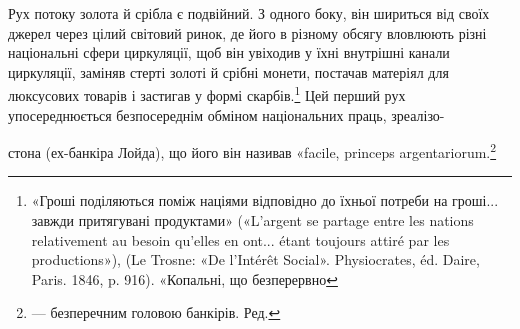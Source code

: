 Рух потоку золота й срібла є подвійний. З одного боку, він
шириться від своїх джерел через цілий світовий ринок, де його
в різному обсягу вловлюють різні національні сфери циркуляції,
щоб він увіходив у їхні внутрішні канали циркуляції, заміняв
стерті золоті й срібні монети, постачав матеріял для люксусових
товарів і застигав у формі скарбів.\footnote{
«Гроші поділяються поміж націями відповідно до їхньої потреби
на гроші... завжди притягувані продуктами» («L’argent se partage
entre les nations relativement au besoin qu’elles en ont... étant toujours
attiré par les productions»), (Le Trosne: «De l’Intérêt Social». Physiocrates,
éd. Daire, Paris. 1846, p. 916). «Копальні, що безперервно
} Цей перший рух упосереднюється
безпосереднім обміном національних праць, зреалізо-

стона (ех-банкіра Лойда), що його він називав «facile, princeps argentariorum.\footnote*{
— безперечним головою банкірів. Ред.
}